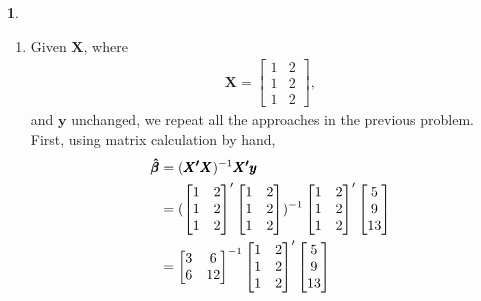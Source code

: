 \documentclass[10pt]{article}
\newtheorem{prob}{\bm{$Problem$}}
\begin{document}
\begin{prob}
\end{prob}
\begin{enumerate}[1)]
\vspace{3mm}

\item
Given $\pmb{X}$, where
\begin{align*}
\pmb{X}=
  \begin{bmatrix}
    1 & 2\\
    1 & 2\\
    1 & 2
  \end{bmatrix}
,
\end{align*}
and $\pmb{y}$ unchanged, we repeat all the approaches in the previous problem.\\
First, using matrix calculation by hand,
\begin{align*}
\pmb{\hat{\beta}}&=(\pmb{X\textsuperscript{$\prime$}}\pmb{X})^{-1}\pmb{X\textsuperscript{$\prime$}}\pmb{y}\\
&=(
  \begin{bmatrix}
    1 & 2\\
    1 & 2\\
    1 & 2
  \end{bmatrix}
'
  \begin{bmatrix}
    1 & 2\\
    1 & 2\\
    1 & 2
  \end{bmatrix}
)^{-1}
  \begin{bmatrix}
    1 & 2\\
    1 & 2\\
    1 & 2
  \end{bmatrix}
'
  \begin{bmatrix}
    5\\
    9\\
    13
  \end{bmatrix}
\\
&=
  \begin{bmatrix}
    3 & 6\\
    6 & 12
  \end{bmatrix}
^{-1}
  \begin{bmatrix}
    1 & 2\\
    1 & 2\\
    1 & 2
  \end{bmatrix}
'
  \begin{bmatrix}
    5\\
    9\\
    13
  \end{bmatrix}

\end{align*}
\end{enumerate}
\end{document}
